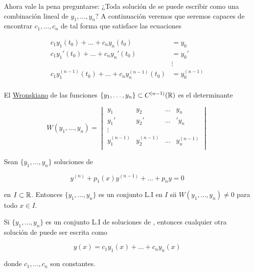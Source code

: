 Ahora vale la pena preguntarse: ¿Toda solución de  se puede escribir como una combinación lineal de $y_1, \dots, y_n$? A continuación veremos que seremos capaces de encontrar $c_1, \dots, c_n$ de tal forma que  satisface las ecuaciones

\begin{equation*}
    \begin{aligned}
        c_1y_1(t_0) + \dots + c_ny_n(t_0) &= y_0 \\
        c_1y_1'(t_0) + \dots + c_ny_n'(t_0) &= y_0' \\
        &\vdots \\
        c_1y_1^{(n-1)}(t_0) + \dots + c_ny_n^{(n-1)}(t_0) &= y_0^{(n-1)} \\
    \end{aligned}
\end{equation*}

\begin{defn}
    El \ul{Wronskiano} de las funciones $\{y_1, \dots, y_n\} \subset C^{(n-1)}(\mathbb{R})$ es el determinante

    \[
        W(y_1, \dots, y_n) =
        \begin{vmatrix}
            y_1  & y_2  & \dots & y_n \\
            y_1' & y_2' & \dots &' y_n \\
            \vdots&     &     \\
            y_1^{(n-1)} & y_2^{(n-1)} & \dots & y_n^{(n-1)} \\
        \end{vmatrix}
    \]
\end{defn}

\begin{teo}
    Sean $\{y_1, \dots, y_n\}$ soluciones de

    \begin{equation}\label{eq:homog}
        y^{(n)} + p_1(x)y^{(n-1)} + \dots + p_ny = 0
    \end{equation}

    \noindent en $I \subset \mathbb{R}$. Entonces $\{y_1, \dots, y_n\}$ es un conjunto L.I en $I$ sii $W(y_1, \dots, y_n) \neq 0$ para todo $x \in I$.
\end{teo}

\begin{teo}
    Si $\{y_1, \dots, y_n\}$ es un conjunto L.I de soluciones de , entonces cualquier otra solución de  puede ser escrita como

    \[
        y(x) = c_1y_1(x) + \dots + c_ny_n(x)
    \]

    \noindent donde $c_1, \dots, c_n$ son constantes.
\end{teo}

